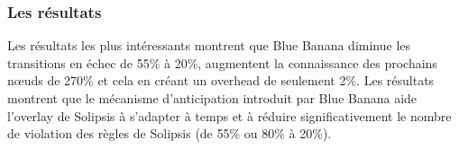 		\subsubsection{Les résultats}
		Les résultats les plus intéressants montrent que Blue Banana diminue les transitions en échec de 55\% à 20\%, augmentent la connaissance des prochains nœuds de 270\% et cela en créant un overhead de seulement 2\%. Les résultats montrent que le mécanisme d'anticipation introduit par Blue Banana aide l'overlay de Solipsis à s'adapter à temps et à réduire significativement le nombre de violation des règles de Solipsis (de 55\% ou 80\% à 20\%). 
